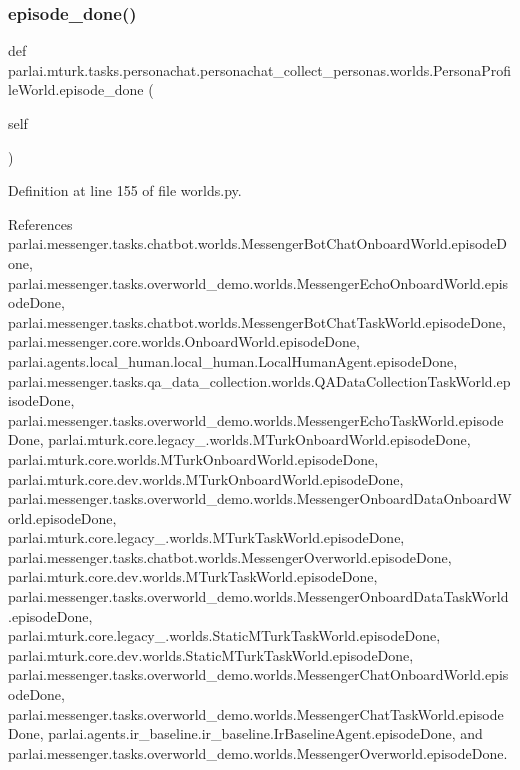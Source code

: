 \subsubsection{\texorpdfstring{episode\+\_\+done()}{episode\_done()}}
{\footnotesize\ttfamily def parlai.\+mturk.\+tasks.\+personachat.\+personachat\+\_\+collect\+\_\+personas.\+worlds.\+Persona\+Profile\+World.\+episode\+\_\+done (\begin{DoxyParamCaption}\item[{}]{self }\end{DoxyParamCaption})}



Definition at line 155 of file worlds.\+py.



References parlai.\+messenger.\+tasks.\+chatbot.\+worlds.\+Messenger\+Bot\+Chat\+Onboard\+World.\+episode\+Done, parlai.\+messenger.\+tasks.\+overworld\+\_\+demo.\+worlds.\+Messenger\+Echo\+Onboard\+World.\+episode\+Done, parlai.\+messenger.\+tasks.\+chatbot.\+worlds.\+Messenger\+Bot\+Chat\+Task\+World.\+episode\+Done, parlai.\+messenger.\+core.\+worlds.\+Onboard\+World.\+episode\+Done, parlai.\+agents.\+local\+\_\+human.\+local\+\_\+human.\+Local\+Human\+Agent.\+episode\+Done, parlai.\+messenger.\+tasks.\+qa\+\_\+data\+\_\+collection.\+worlds.\+Q\+A\+Data\+Collection\+Task\+World.\+episode\+Done, parlai.\+messenger.\+tasks.\+overworld\+\_\+demo.\+worlds.\+Messenger\+Echo\+Task\+World.\+episode\+Done, parlai.\+mturk.\+core.\+legacy\+\_.\+worlds.\+M\+Turk\+Onboard\+World.\+episode\+Done, parlai.\+mturk.\+core.\+worlds.\+M\+Turk\+Onboard\+World.\+episode\+Done, parlai.\+mturk.\+core.\+dev.\+worlds.\+M\+Turk\+Onboard\+World.\+episode\+Done, parlai.\+messenger.\+tasks.\+overworld\+\_\+demo.\+worlds.\+Messenger\+Onboard\+Data\+Onboard\+World.\+episode\+Done, parlai.\+mturk.\+core.\+legacy\+\_.\+worlds.\+M\+Turk\+Task\+World.\+episode\+Done, parlai.\+messenger.\+tasks.\+chatbot.\+worlds.\+Messenger\+Overworld.\+episode\+Done, parlai.\+mturk.\+core.\+dev.\+worlds.\+M\+Turk\+Task\+World.\+episode\+Done, parlai.\+messenger.\+tasks.\+overworld\+\_\+demo.\+worlds.\+Messenger\+Onboard\+Data\+Task\+World.\+episode\+Done, parlai.\+mturk.\+core.\+legacy\+\_.\+worlds.\+Static\+M\+Turk\+Task\+World.\+episode\+Done, parlai.\+mturk.\+core.\+dev.\+worlds.\+Static\+M\+Turk\+Task\+World.\+episode\+Done, parlai.\+messenger.\+tasks.\+overworld\+\_\+demo.\+worlds.\+Messenger\+Chat\+Onboard\+World.\+episode\+Done, parlai.\+messenger.\+tasks.\+overworld\+\_\+demo.\+worlds.\+Messenger\+Chat\+Task\+World.\+episode\+Done, parlai.\+agents.\+ir\+\_\+baseline.\+ir\+\_\+baseline.\+Ir\+Baseline\+Agent.\+episode\+Done, and parlai.\+messenger.\+tasks.\+overworld\+\_\+demo.\+worlds.\+Messenger\+Overworld.\+episode\+Done.

